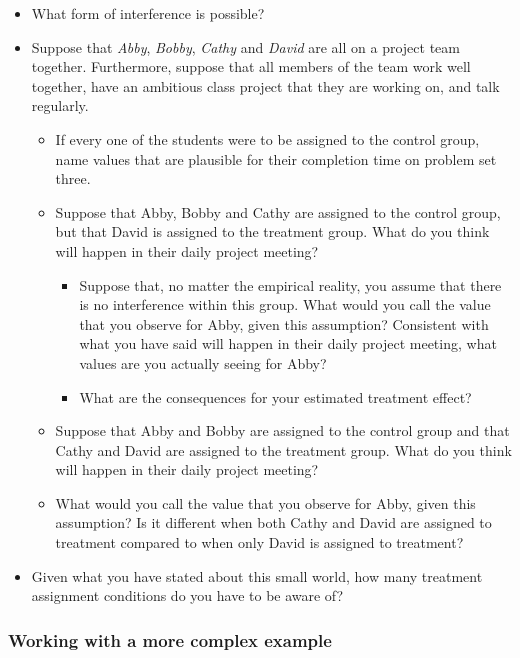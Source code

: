 \documentclass[
]{article}
\providecommand{\tightlist}{%
  \setlength{\itemsep}{0pt}\setlength{\parskip}{0pt}}
\theoremstyle{definition}
\theoremstyle{definition}
\theoremstyle{definition}
\theoremstyle{definition}
\theoremstyle{remark}
\begin{document}
\begin{itemize}
\tightlist
\item
  What form of interference is possible?
\item
  Suppose that \emph{Abby}, \emph{Bobby}, \emph{Cathy} and \emph{David} are all on a project team together. Furthermore, suppose that all members of the team work well together, have an ambitious class project that they are working on, and talk regularly.

  \begin{itemize}
  \tightlist
  \item
    If every one of the students were to be assigned to the control group, name values that are plausible for their completion time on problem set three.
  \item
    Suppose that Abby, Bobby and Cathy are assigned to the control group, but that David is assigned to the treatment group. What do you think will happen in their daily project meeting?

    \begin{itemize}
    \tightlist
    \item
      Suppose that, no matter the empirical reality, you assume that there is no interference within this group. What would you call the value that you observe for Abby, given this assumption? Consistent with what you have said will happen in their daily project meeting, what values are you actually seeing for Abby?
    \item
      What are the consequences for your estimated treatment effect?
    \end{itemize}
  \item
    Suppose that Abby and Bobby are assigned to the control group and that Cathy and David are assigned to the treatment group. What do you think will happen in their daily project meeting?
  \item
    What would you call the value that you observe for Abby, given this assumption? Is it different when both Cathy and David are assigned to treatment compared to when only David is assigned to treatment?
  \end{itemize}
\item
  Given what you have stated about this small world, how many treatment assignment conditions do you have to be aware of?
\end{itemize}

\subsubsection{Working with a more complex example}\label{working-with-a-more-complex-example}
\end{document}
